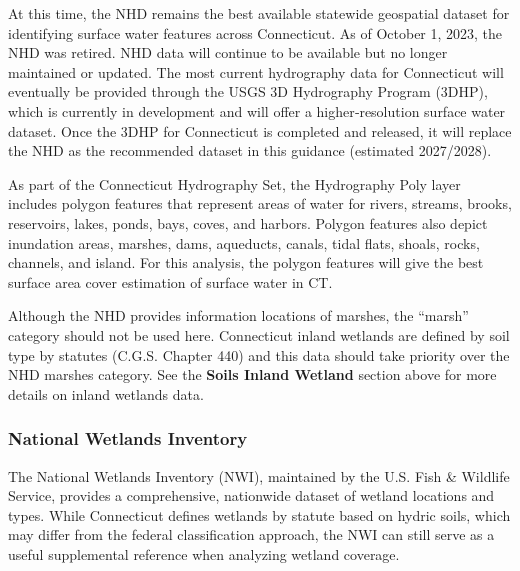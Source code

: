 \documentclass[
  letterpaper,
  DIV=11,
  numbers=noendperiod]{scrreprt}
\begin{document}
At this time, the NHD remains the best available statewide geospatial
dataset for identifying surface water features across Connecticut. As of
October 1, 2023, the NHD was retired. NHD data will continue to be
available but no longer maintained or updated. The most current
hydrography data for Connecticut will eventually be provided through the
USGS 3D Hydrography Program (3DHP), which is currently in development
and will offer a higher‑resolution surface water dataset. Once the 3DHP
for Connecticut is completed and released, it will replace the NHD as
the recommended dataset in this guidance (estimated 2027/2028).

As part of the Connecticut Hydrography Set, the Hydrography Poly layer
includes polygon features that represent areas of water for rivers,
streams, brooks, reservoirs, lakes, ponds, bays, coves, and harbors.
Polygon features also depict inundation areas, marshes, dams, aqueducts,
canals, tidal flats, shoals, rocks, channels, and island. For this
analysis, the polygon features will give the best surface area cover
estimation of surface water in CT.

\begin{tcolorbox}[enhanced jigsaw, arc=.35mm, bottomrule=.15mm, breakable, colback=white, colframe=quarto-callout-note-color-frame, left=2mm, leftrule=.75mm, opacityback=0, rightrule=.15mm, toprule=.15mm]

Although the NHD provides information locations of marshes, the
``marsh'' category should not be used here. Connecticut inland wetlands
are defined by soil type by statutes (C.G.S. Chapter 440) and this data
should take priority over the NHD marshes category. See the
\textbf{Soils Inland Wetland} section above for more details on inland
wetlands data.

\end{tcolorbox}

\subsubsection{National Wetlands Inventory}\label{sec-nwi}

The National Wetlands Inventory (NWI), maintained by the U.S. Fish \&
Wildlife Service, provides a comprehensive, nationwide dataset of
wetland locations and types. While Connecticut defines wetlands by
statute based on hydric soils, which may differ from the federal
classification approach, the NWI can still serve as a useful
supplemental reference when analyzing wetland coverage.
\end{document}
